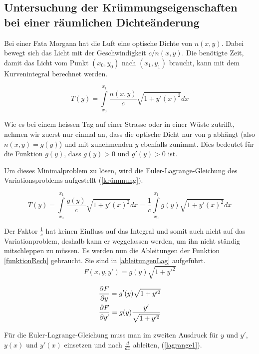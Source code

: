 \subsection{Untersuchung der Krümmungseigenschaften bei einer räumlichen Dichteänderung}

Bei einer Fata Morgana hat die Luft eine optische Dichte von $n(x,y)$. 
Dabei bewegt sich das Licht mit der Geschwindigkeit $c/n(x,y)$. 
Die benötigte Zeit, damit das Licht vom Punkt $(x_0, y_0)$ nach $(x_1, y_1)$ braucht,
kann mit dem Kurvenintegral berechnet werden.

\begin{equation}
T(y) = \int \limits_{x_0}^{x_1} \frac{n(x,y)}{c} \sqrt{1 + y'(x)^2} dx
\end{equation}

Wie es bei einem heissen Tag auf einer Strasse oder in einer Wüste zutrifft,
nehmen wir zuerst nur einmal an, dass die optische Dicht nur von $y$ abhängt
(also $n(x,y) = g(y)$) und mit zunehmenden $y$ ebenfalls zunimmt. 
Dies bedeutet für die Funktion $g(y)$, dass $g(y) > 0$ und $g'(y) > 0 $ ist.

Um dieses Minimalproblem zu lösen, wird die Euler-Lagrange-Gleichung des Variationsproblems aufgestellt (\eqref{krümmung}).

\begin{equation}
	T(y) = \int \limits_{x_0}^{x_1} \frac{g(y)}{c} \sqrt{1 + y'(x)^2} dx = \frac{1}{c} \int \limits_{x_0}^{x_1} g(y) \sqrt{1 + y'(x)^2} dx
	\label{krümmung}
\end{equation}

Der Faktor $\frac{1}{c}$ hat keinen Einfluss auf das Integral und somit auch nicht auf das Variationproblem, deshalb kann er weggelassen werden, um ihn nicht ständig mitschleppen zu müssen.
Es werden nun die Ableitungen der Funktion \ref{funktionRech} gebraucht. Sie sind in \ref{ableitungenLag} aufgeführt.
\begin{equation}
	F(x,y,y') = g(y) \sqrt{1 + y'^2}
	\label{funktionRech}
\end{equation}

\begin{align}
	\frac{\partial F}{\partial y} = g'(y) \sqrt{1 + y'^2} \notag \\
	\frac{\partial F}{\partial y'} = g(y) \frac{y'}{\sqrt{1 + y'^2}}
	\label{ableitungenLag}
\end{align}

Für die Euler-Lagrange-Gleichung muss man im zweiten Ausdruck für $y$ und $y'$, $y(x)$ 
und $y'(x)$ einsetzen und nach $\frac{d}{dx}$ ableiten, (\eqref{lagrange1}).

